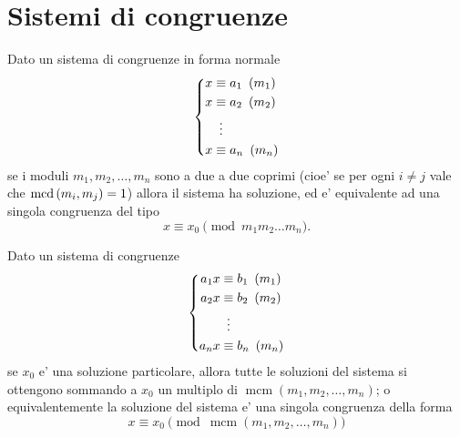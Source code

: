 \section{Sistemi di congruenze}

\begin{theorem}
     \label{th_cinese}
    Dato un sistema di congruenze in forma normale 
    \begin{equation*}
        \left\{
        \begin{alignedat}{1}
            x&\equiv a_1 \Mod{m_1}\\
            x&\equiv a_2 \Mod{m_2}\\
            &\vdotswithin{\equiv} \\
            x&\equiv a_n \Mod{m_n}
        \end{alignedat}      
        \right . 
    \end{equation*}
    se i moduli $m_1, m_2, \dots, m_n$ sono a due a due coprimi (cioe' se per ogni $i \neq j$ vale che $\operatorname{mcd}\left(m_i, m_j\right) = 1$) allora il sistema ha soluzione, ed e' equivalente ad una singola congruenza del tipo
    \begin{equation}
        x \equiv x_0 \pmod{m_1 m_2 \dots m_n}.
    \end{equation} 
\end{theorem}

\begin{proposition}
    Dato un sistema di congruenze 
    \begin{equation*}
        \left\{
        \begin{alignedat}{1}
            a_1x &\equiv b_1 \Mod{m_1}\\
            a_2x &\equiv b_2 \Mod{m_2}\\
            &\vdotswithin{\equiv} \\
            a_nx &\equiv b_n \Mod{m_n}
        \end{alignedat}      
        \right . 
    \end{equation*}
    se $x_0$ e' una soluzione particolare, allora tutte le soluzioni del sistema si ottengono sommando a $x_0$ un multiplo di $\operatorname{mcm}(m_1, m_2, \dots, m_n)$; o equivalentemente la soluzione del sistema e' una singola congruenza della forma
    \begin{equation}
        x \equiv x_0 \pmod{\operatorname{mcm}(m_1, m_2, \dots, m_n)}
    \end{equation}
\end{proposition}

